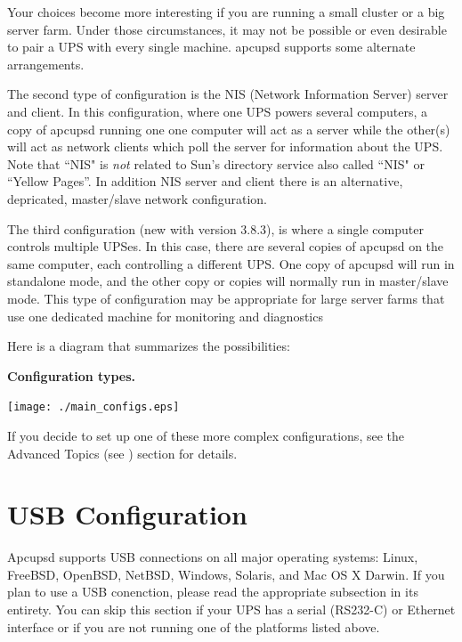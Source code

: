 Your choices become more interesting if you are running a small cluster or a
big server farm.  Under those circumstances, it may not be possible or even
desirable to pair a UPS with every single machine.  apcupsd supports some
alternate arrangements.  

The second type of configuration is the NIS (Network Information Server)
server and client.  In this configuration, where one UPS powers several
computers, a copy of apcupsd running one one computer will act as a
server while the other(s) will act as network clients which poll the
server for information about the UPS.  Note that ``NIS" is \emph{not}
related to Sun's directory service also called ``NIS" or ``Yellow
Pages''.  In addition NIS server and client there is an alternative,
depricated, master/slave network configuration.

The third configuration (new with version 3.8.3), is where a single computer
controls multiple UPSes. In this case, there are several copies of apcupsd on
the same computer, each controlling a different UPS. One copy of apcupsd will
run in standalone mode, and the other copy or copies will normally run in
master/slave mode.  This type of configuration may be appropriate for large
server farms that use one dedicated machine for monitoring and diagnostics  

Here is a diagram that summarizes the possibilities: 

\label{Configuration-types_005f}

{\bf Configuration types.}  

\texttt{[image: ./main\_configs.eps]}

If you decide to set up one of these more complex configurations, see the
Advanced Topics (see 
) section for details. 

\section*{USB Configuration}
\label{USB-Configuration}

Apcupsd supports USB connections on all major operating systems: Linux,
FreeBSD, OpenBSD, NetBSD, Windows, Solaris, and Mac OS X Darwin. If
you plan to use a USB conenction, please read the appropriate subsection in
its entirety. You can skip this section if your UPS has a serial (RS232-C)
or Ethernet interface or if you are not running one of the platforms listed
above.

